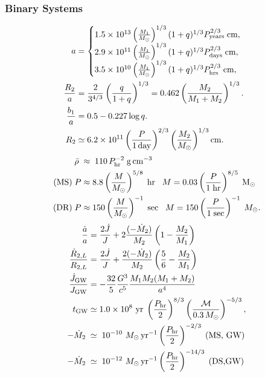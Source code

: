 \begin{multicols}{2}
\subsubsection*{Binary Systems}
\[
\begin{aligned}
        a &= \begin{cases}
        1.5\times 10^{13} \left(\frac{M_1}{M_\odot}\right)^{1/3} (1+q)^{1/3} P_{\rm years}^{2/3}\; {\rm cm},&\\
                2.9\times 10^{11} \left(\frac{M_1}{M_\odot}\right)^{1/3} (1+q)^{1/3} P_{\rm days}^{2/3}\; {\rm cm},&\\
                        3.5\times10^{10} \left(\frac{M_1}{M_\odot}\right)^{1/3} (1+q)^{1/3} P_{\rm hrs}^{2/3}\; {\rm cm},&\\
    \end{cases}\\
            \frac{R_2}{a} &= \frac{2}{3^{4/3}}\left(\frac{q}{1+q}\right)^{1/3} = 0.462\left(\frac{M_2}{M_1+M_2}\right)^{1/3}.\\
                \frac{b_1}{a} &= 0.5 - 0.227 \log q. \\
                R_2 &\simeq 6.2 \times 10^{11}
\left(\frac{P}{{\rm 1\,day}}\right)^{2/3}
\left(\frac{M_2}{M_\odot}\right)^{1/3}
{\rm cm}.\\
\end{aligned}
\]
\[
\begin{aligned}
\bar{\rho} \;&\approx\; 110\,P_{\rm hr}^{-2}\;{\rm g\,cm^{-3}}\\
\text{(MS)}\; P &\approx 8.8\left(\frac{M}{M_\odot}\right)^{5/8}\;{\rm hr}\;\;\;M = 0.03\left(\frac{P}{\rm 1\;hr}\right)^{8/5}\;{\rm M_\odot}\\
\text{(DR)}\; P &\approx 150\left(\frac{M}{M_\odot}\right)^{-1}\;{\rm sec}\;\;\;M = 150 \left(\frac{P}{1\;\rm sec}\right)^{-1}\;M_\odot.
\end{aligned}
\]
\[
\begin{aligned}
    \frac{\dot{a}}{a} &= \frac{2\dot{J}}{J} + 2\frac{(-\dot{M}_2)}{M_2}\left(1-\frac{M_2}{M_1}\right)\\
    \frac{\dot{R}_{2,L}}{R_{2,L}} &= \frac{2\dot{J}}{J} + \frac{2(-\dot{M}_2)}{M_2}\left(\frac{5}{6}- \frac{M_2}{M_1}\right)\\
    \frac{\dot{J}_{\rm GW}}{J_{\rm GW}} &= -\frac{32}{5}\frac{G^{3}}{c^5}
        \frac{M_1M_2(M_1 + M_2)}{a^{4}}\\
        t_{\rm GW} &\simeq 1.0\times10^{8}\ {\rm yr}\;
\left(\frac{P_{\rm hr}}{2}\right)^{8/3}
\left(\frac{\mathcal{M}}{0.3\,M_\odot}\right)^{-5/3},\\
    -\dot{M}_2 \;&\simeq\;
    10^{-10}\ M_\odot\,{\rm yr^{-1}}
    \left(\frac{P_{\rm hr}}{2}\right)^{-2/3}\;\text{(MS, GW)}\\
    -\dot{M}_2 \;&\simeq\;
    10^{-12}\ M_\odot\,{\rm yr^{-1}}
    \left(\frac{P_{\rm hr}}{2}\right)^{-14/3}\;\text{(DS,GW)}\\
\end{aligned}
\]

\end{multicols}

